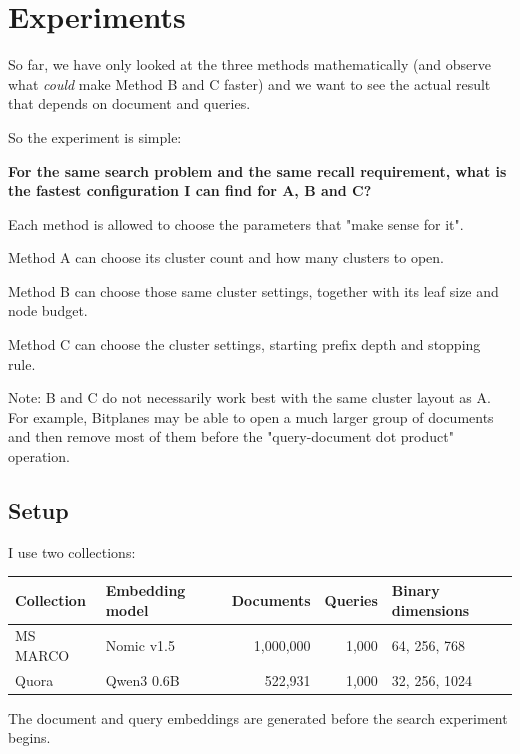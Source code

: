 \usetikzlibrary{plotmarks}
\section{Experiments}
\label{sec:experiments}
So far, we have only looked at the three methods mathematically (and observe what \emph{could} make Method B and C faster) and we want to see the actual result that depends on document and queries.


So the experiment is simple:

\textbf{For the same search problem and the same recall requirement, what is the fastest configuration I can find for A, B and C?}

Each method is allowed to choose the parameters that "make sense for it".

Method A can choose its cluster count and how many clusters to open.

Method B can choose those same cluster settings, together with its leaf size and node budget.

Method C can choose the cluster settings, starting prefix depth and stopping rule.


Note: B and C do not necessarily work best with the same cluster layout as A. For example, Bitplanes may be able to open a much larger group of documents and then remove most of them before the "query-document dot product" operation.

\subsection{Setup}
I use two collections:
\begin{center}\small
\begin{tabular}{@{}llrrl@{}}\toprule
Collection & Embedding model & Documents & Queries & Binary dimensions\\\midrule
MS MARCO & Nomic v1.5 & 1,000,000 & 1,000 & 64, 256, 768\\
Quora & Qwen3 0.6B & 522,931 & 1,000 & 32, 256, 1024\\\bottomrule
\end{tabular}
\end{center}
The document and query embeddings are generated before the search experiment begins.


